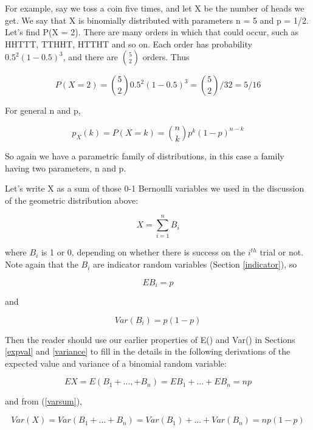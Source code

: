 For example, say we toss a coin five times, and let X be the number of
heads we get.  We say that X is binomially distributed with parameters n
= 5 and p = 1/2.  Let's find P(X = 2).  There are many orders in which
that could occur, such as HHTTT, TTHHT, HTTHT and so on.  Each order has
probability $0.5^2(1-0.5)^3$, and there are $\binom{5}{2}$ orders.  Thus

\begin{equation}
P(X = 2) = \binom{5}{2} 0.5^2(1-0.5)^3 = \binom{5}{2} / 32 = 5/16 
\end{equation}

For general n and p,

\begin{equation}
p_X(k) = P(X = k) = \binom{n}{k} p^k (1-p)^{n-k}  
\end{equation}

So again we have a parametric family of distributions, in this case a
family having two parameters, n and p.

Let's write X as a sum of those 0-1 Bernoulli variables we used in the
discussion of the geometric distribution above:

\begin{equation}
X = \sum_{i=1}^{n} B_i
\end{equation}

where $B_i$ is 1 or 0, depending on whether there is success on the
$i^{th}$ trial or not.  Note again that the $B_i$ are indicator random
variables (Section \ref{indicator}),  so 

\begin{equation}
EB_i = p
\end{equation}

and 

\begin{equation}
Var(B_i) = p(1-p)
\end{equation}

Then the reader should use our earlier properties of E() and Var() in
Sections \ref{expval} and \ref{variance} to fill in the details in the
following derivations of the expected value and variance of a binomial
random variable:

\begin{equation}
\label{binmean}
EX = E(B_1+...,+B_n) = EB_1 + ... + EB_n = np
\end{equation}

and from (\ref{varsum}),

\begin{equation}
\label{binvar}
Var(X) = Var(B_1+...+B_n) = Var(B_1) + ... + Var(B_n) = np(1-p)
\end{equation}

